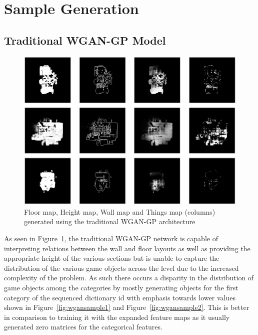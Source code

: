 \documentclass{Configuration_Files/PoliMi3i_thesis}
\begin{document}
\section{Sample Generation}
\subsection{Traditional WGAN-GP Model}
\begin{figure}[H]
    \centering
    \includegraphics[width=1\textwidth]{wgan_sample.jpg}
    \caption[Samples generated using the traditional WGAN-GP architecture]{Floor map, Height map, Wall map and Things map (columns) generated using the traditional WGAN-GP architecture}
    \label{fig:wgansample}
\end{figure}
As seen in Figure~\ref{fig:wgansample}, the traditional WGAN-GP network  is capable of interpreting 
relations between the wall and floor layouts as well as providing the appropriate height of the 
various sections but is unable to capture the distribution of the various game objects 
across the level due to the increased complexity of the problem. As such there occurs 
a disparity in the distribution of game objects among the categories by mostly 
generating objects for the first category of the sequenced dictionary id with emphasis 
towards lower values shown in Figure~\ref{fig:wgansample1} and Figure~\ref{fig:wgansample2}. 
This is better in comparison to training it with the expanded feature maps as it usually generated zero 
matrices for the categorical features.
\end{document}
